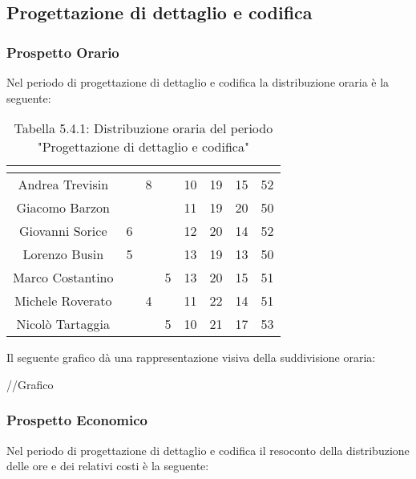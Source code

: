 \subsection{Progettazione di dettaglio e codifica}

\subsubsection{Prospetto Orario}
Nel periodo di progettazione di dettaglio e codifica la distribuzione oraria è la seguente:

\renewcommand{\arraystretch}{1.5}
\begin{table}[H]
\begin{center}
\begin{tabular}{|c|c|c|c|c|c|c|c|}
\hline
\rowcolor{title_row}
\textbf{\color{title_text}{Nome}} & \textbf{\color{title_text}{Resp.}} & \textbf{\color{title_text}{Ammi.}} & \textbf{\color{title_text}{Analist.}} & \textbf{\color{title_text}{Progett.}} & \textbf{\color{title_text}{Program.}} & \textbf{\color{title_text}{Verific.}} & \textbf{\color{title_text}{Totale}} \\ \hline
Andrea Trevisin  & & 8 & & 10 & 19 & 15 & 52  \\ \hline
Giacomo Barzon   & & & & 11 & 19 & 20 & 50 \\ \hline
Giovanni Sorice  & 6 & & & 12 & 20 & 14 & 52  \\ \hline
Lorenzo Busin    & 5 & & & 13 & 19 & 13 & 50  \\ \hline
Marco Costantino & & & 5 & 13 & 20 & 15 & 51 \\ \hline
Michele Roverato & & 4 & & 11 & 22 & 14 & 51  \\ \hline
Nicolò Tartaggia & & & 5 & 10 & 21 & 17 & 53  \\ \hline
\end{tabular}
\caption{Tabella 5.4.1: Distribuzione oraria del periodo "Progettazione di dettaglio e codifica"\label{}}
\end{center}
\end{table}
\renewcommand{\arraystretch}{1}

Il seguente grafico dà una rappresentazione visiva della suddivisione oraria: \\
\begin{center}
//Grafico
\end{center}


\subsubsection{Prospetto Economico}
Nel periodo di progettazione di dettaglio e codifica il resoconto della distribuzione delle ore e dei relativi costi è la seguente:

